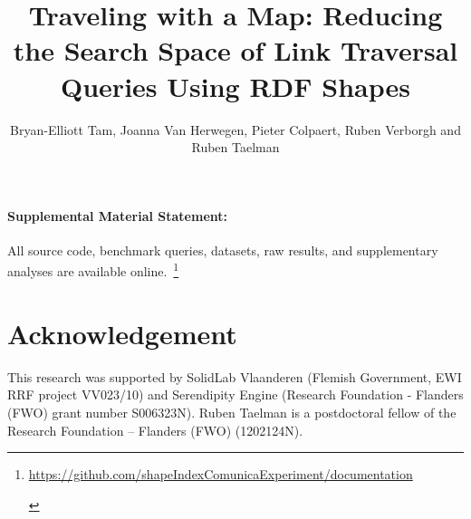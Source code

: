 \documentclass[Afour,sageh,times]{sagej}
\makeatletter
\newif\ifanonymous
\newcommand*\@LN@outerlinenumber{%
    \if@firstcolumn \makeLineNumberLeft \else \makeLineNumberRight \fi}
\makeatother
\begin{document}
\ifreview
  \linenumbers
  \makeatletter\let\makeLineNumber\@LN@outerlinenumber\makeatother
\fi
{}

\title{Traveling with a Map: Reducing the Search Space of Link Traversal Queries Using RDF Shapes}
\ifanonymous
      \author{Anonymous}
    \else
      \author{Bryan-Elliott Tam, Joanna Van Herwegen, Pieter Colpaert, Ruben Verborgh and Ruben Taelman}



   \fi





\maketitle

\acresetall
\renewcommand{\thefootnote}{\arabic{footnote}}
\setcounter{footnote}{1}









\paragraph*{Supplemental Material Statement:}\label{sec:supplementalMaterial} All source code, benchmark queries, datasets, raw results, and supplementary analyses are available online.~\footnote{
    \ifanonymous
       \url{https://anonymous.4open.science/r/documentation-1A65}
    \else
       \url{https://github.com/shapeIndexComunicaExperiment/documentation}
    \fi
    \label{sf:supplementalMaterial}}

\section{Acknowledgement}

This research was supported by SolidLab Vlaanderen (Flemish Government, EWI RRF project VV023/10) and Serendipity Engine (Research Foundation - Flanders (FWO) grant number S006323N).
Ruben Taelman is a postdoctoral fellow of the Research Foundation – Flanders (FWO) (1202124N).

\printbibliography
{}


\end{document}
